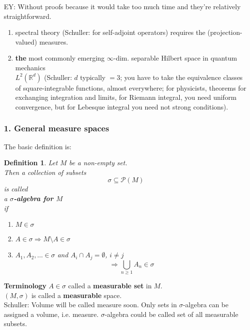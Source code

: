\documentclass[10pt]{amsart}
\newtheorem{definition}{Definition}
\begin{document}
\begin{multicols*}{2}
EY: Without proofs because it would take too much time and they're relatively straightforward.

\begin{enumerate}
	\item spectral theory (Schuller: for self-adjoint operators) requires the (projection-valued) measures.
	\item \textbf{the} most commonly emerging $\infty$-dim. separable Hilbert space in quantum mechanics \\
	$L^2(\mathbb{R}^d)$ (Schuller: $d$ typically $=3$; you have to take the equivalence classes of square-integrable functions, almost everywhere; for physicists, theorems for exchanging integration and limits, for Riemann integral, you need uniform convergence, but for Lebesque integral you need not strong conditions). 
\end{enumerate}

\subsubsection{1. General measure spaces}

The basic definition is:
\begin{definition}
	Let $M$ be a non-empty set. \\
	Then a collection of subsets  
	\[
	\sigma \subseteq \mathcal{P}(M)
	\] is called \\
	a \textbf{$\sigma$-algebra for $M$} \\
	if \begin{enumerate}
		\item $M \in \sigma$ \\
		\item $A \in \sigma \Longrightarrow M  \setminus A \in \sigma$
		\item $A_1, A_2, \dots \in \sigma$ and $A_i \cap A_j = \emptyset$, $i\neq j$
		\[
		\Longrightarrow \bigcup_{n\geq 1} A_n \in \sigma
		\]
	\end{enumerate}
\end{definition}

\textbf{Terminology} $A\in \sigma$ called a \textbf{measurable set} in $M$. \\
\phantom{Terminology} $(M, \sigma)$ is called a \textbf{measurable} space. \\

Schuller: Volume will be called measure soon. Only sets in $\sigma$-algebra can be assigned a volume, i.e. measure. $\sigma$-algebra could be called set of all measurable subsets.


\end{multicols*}
\end{document}
